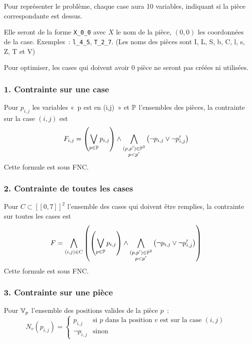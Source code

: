 Pour représenter le problème, chaque case aura 10 variables,
indiquant si la pièce correspondante est dessus.

Elle seront de la forme \verb|X_0_0| avec $X$ le nom de la pièce, $(0,0)$ les
coordonnées de la case.
Exemples~: \verb|l_4_5|, \verb|T_2_7|. (Les noms des pièces sont I, L, S, b, C,
l, s, Z, T et V)

Pour optimiser, les cases qui doivent avoir 0 pièce ne seront pas créées ni
utilisées.

\subsubsection*{1. Contrainte sur une case}
Pour $p_{i,j}$ les variables «~p est en (i,j)~» et $\mathbb{P}$ l'ensembles des
pièces, la contrainte sur la case $(i,j)$ est
\begin{equation*}
    F_{i,j} = \left(\bigvee_{p\in\mathbb{P}} p_{i,j} \right) \land
    \bigwedge_{\substack{(p,p')\in\mathbb{P}^2\\p<p'}}\left(\lnot p_{i,j} \lor \lnot p'_{i,j}\right)
\end{equation*}
Cette formule est sous FNC.

\subsubsection*{2. Contrainte de toutes les cases}
Pour $C \subset [\![0,7]\!]^2$ l'ensemble des cases qui doivent être remplies,
la contrainte sur toutes les cases est
\begin{equation*}
    F = \bigwedge_{(i,j)\in C} \left(\left(\bigvee_{p\in\mathbb{P}} p_{i,j} \right) \land
        \bigwedge_{\substack{(p,p')\in\mathbb{P}^2\\p<p'}}\left(\lnot p_{i,j} \lor \lnot p'_{i,j}\right)\right)
\end{equation*}
Cette formule est sous FNC.

\subsubsection*{3. Contrainte sur une pièce}
Pour $\mathbb{V}_p$ l'ensemble des positions valides de la pièce $p$~:
\begin{equation*}
    N_v(p_{i,j}) = \begin{cases}
        p_{i,j} & \text{si $p$ dans la position $v$ est sur la case $(i,j)$}\\
        \lnot p_{i,j} & \text{sinon}
    \end{cases}
\end{equation*}

